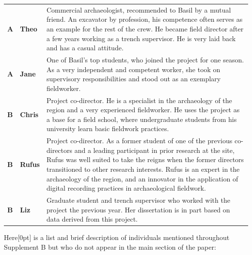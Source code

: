 \documentclass[
]{article}
\newcommand{\paragraphnumber}[1]{\marginnote{\color{lightgray}\tiny{#1}}[0pt]}
\begin{document}
\begin{longtable}[]{@{}
  >{\raggedright\arraybackslash}p{}
  >{\raggedright\arraybackslash}p{}
  >{\raggedright\arraybackslash}p{}@{}}
\toprule\noalign{}
\endhead
\bottomrule\noalign{}
\endlastfoot
\textbf{A} & \textbf{Theo} & Commercial archaeologist, recommended to
Basil by a mutual friend. An excavator by profession, his competence
often serves as an example for the rest of the crew. He became field
director after a few years working as a trench supervisor. He is very
laid back and has a casual attitude. \\
\textbf{A} & \textbf{Jane} & One of Basil's top students, who joined the
project for one season. As a very independent and competent worker, she
took on supervisory responsibilities and stood out as an exemplary
fieldworker. \\
\textbf{B} & \textbf{Chris} & Project co-director. He is a specialist in
the archaeology of the region and a very experienced fieldworker. He
uses the project as a base for a field school, where undergraduate
students from his university learn basic fieldwork practices. \\
\textbf{B} & \textbf{Rufus} & Project co-director. As a former student
of one of the previous co-directors and a leading participant in prior
research at the site, Rufus was well suited to take the reigns when the
former directors transitioned to other research interests. Rufus is an
expert in the archaeology of the region, and an innovator in the
application of digital recording practices in archaeological
fieldwork. \\
\textbf{B} & \textbf{Liz} & Graduate student and trench supervisor who
worked with the project the previous year. Her dissertation is in part
based on data derived from this project. \\
\end{longtable}

Here\paragraphnumber{[93]} is a list and brief description of
individuals mentioned throughout Supplement B but who do not appear in
the main section of the paper:
\end{document}
